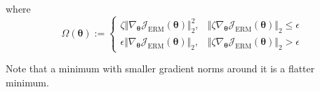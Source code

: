 \documentclass[landscape,a0paper,fontscale=0.3]{baposter}
\begin{document}
\begin{poster}
{where
\vspace{-1.1em}
\begin{equation*}
\Omega(\boldsymbol{\theta}):=\begin{cases}
\zeta\Vert\nabla_{\boldsymbol{\theta}}\mathcal{J}_\mathrm{ERM}(\boldsymbol{\theta})\Vert_2^2,&\!\!\!\!\Vert\zeta\nabla_{\boldsymbol{\theta}}\mathcal{J}_\mathrm{ERM}(\boldsymbol{\theta})\Vert_2\le\epsilon\\
\epsilon\Vert\nabla_{\boldsymbol{\theta}}\mathcal{J}_\mathrm{ERM}(\boldsymbol{\theta})\Vert_2,&\!\!\!\!\Vert\zeta\nabla_{\boldsymbol{\theta}}\mathcal{J}_\mathrm{ERM}(\boldsymbol{\theta})\Vert_2>\epsilon
\end{cases}
\end{equation*}
\vspace{-1.5em}

Note that a minimum with smaller gradient norms around it is a flatter minimum.
}

\end{poster}
\end{document}
